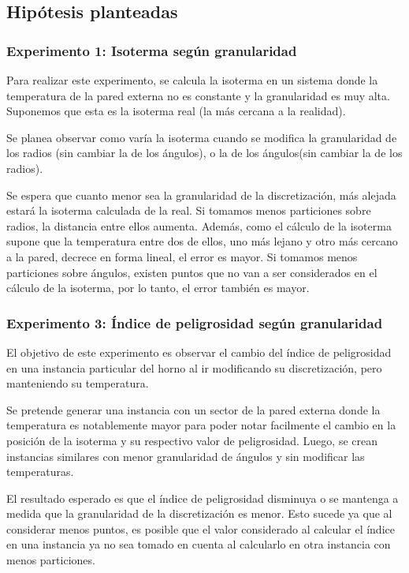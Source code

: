   \subsection{Hipótesis planteadas}

  	\subsubsection*{Experimento 1: Isoterma según granularidad}
  	Para realizar este experimento, se calcula la isoterma en un sistema donde la temperatura de la pared externa no es constante y la granularidad es muy alta. Suponemos que esta es la isoterma real (la más cercana a la realidad). 

  	Se planea observar como varía la isoterma cuando se modifica la granularidad de los radios (sin cambiar la de los ángulos), o la de los ángulos(sin cambiar la de los radios).

    Se espera que cuanto menor sea la granularidad de la discretización, más alejada estará la isoterma calculada de la real. Si tomamos menos particiones sobre radios, la distancia entre ellos aumenta. Además, como el cálculo de la isoterma supone que la temperatura entre dos de ellos, uno más lejano y otro más cercano a la pared, decrece en forma lineal, el error es mayor. Si tomamos menos particiones sobre ángulos, existen puntos que no van a ser considerados en el cálculo de la isoterma, por lo tanto, el error también es mayor.

  	\subsubsection*{Experimento 3: Índice de peligrosidad según granularidad}
  	El objetivo de este experimento es observar el cambio del índice de peligrosidad en una instancia particular del horno al ir modificando su discretización, pero manteniendo su temperatura. 

  	Se pretende generar una instancia con un sector de la pared externa donde la temperatura es notablemente mayor para poder notar facilmente el cambio en la posición de la isoterma y su respectivo valor de peligrosidad. Luego, se crean instancias similares con menor granularidad de ángulos y sin modificar las temperaturas. 

    El resultado esperado es que el índice de peligrosidad disminuya o se mantenga a medida que la granularidad de la discretización es menor. Esto sucede ya que al considerar menos puntos, es posible que el valor considerado al calcular el índice en una instancia ya no sea tomado en cuenta al calcularlo en otra instancia con menos particiones.

